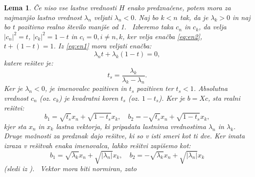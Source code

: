 \documentclass[12pt,a4paper]{amsart}\usepackage[slovene]{babel}%
\theoremstyle{definition}\newtheorem{definicija}{Definicija}[section]\newtheorem{primer}[definicija]{Primer}\newtheorem{opomba}[definicija]{Opomba}
\theoremstyle{plain}\newtheorem{lema}[definicija]{Lema}\newtheorem{izrek}[definicija]{Izrek}\newtheorem{trditev}[definicija]{Trditev}\newtheorem{posledica}[definicija]{Posledica}
\newcommand{\abs}[1]{ \left\lvert#1\right\rvert} \newcommand{\norm}[1]{\left\lVert#1\right\rVert}%
\begin{document}
{\begin{lema}
Če niso vse lastne vrednosti $H$ enako predznačene, potem mora za najmanjšo lastno vrednost $\lambda_n$ veljati $\lambda_n <0$. Naj bo $k<n$ tak, da je $\lambda_k >0$ in naj bo $t$ pozitivno realno število manjše od 1.  Izberemo taka $c_n$ in $c_k$, da velja  $\abs{c_n}^2 =t$, $\abs{c_k}^2=1-t$ in $c_i =0, i\not=n,k$, ker velja enačba \eqref{eq:en2}, $t+ (1-t)=1$. Iz \eqref{eq:en1} mora veljati enačba: $$\lambda_n t +\lambda_k (1-t)=0,$$ katere rešitev je:\begin{equation}t_s=\frac{\lambda_k}{\lambda_k -\lambda_n}.\end{equation}Ker je $\lambda_n <0$, je imenovalec pozitiven in $t_s$ pozitiven ter $t_s <1$. Absolutna vrednost $c_n$ (oz. $c_k$) je kvadratni koren $t_s$ (oz. $1-t_s$). Ker je $b=Xc$, sta realni rešitvi: $$b_1=\sqrt{t_s}x_n +\sqrt{1-t_s}x_k,\quad b_2=-\sqrt{t_s}x_n+\sqrt{1-t_s}x_k,$$ kjer sta $x_n$ in $x_k$ lastna vektorja, ki pripadata lastnima vrednostima $\lambda_n$ in $\lambda_k$. Druge možnosti za predznak dajo rešitve, ki so v isti smeri kot ti dve. Ker imata izraza v rešitvah enaka imenovalca, lahko rešitvi zapišemo kot: $$b_1=\sqrt{\lambda_k}x_n+\sqrt{\abs{\lambda_n}}x_k, \quad b_2=-\sqrt{\lambda_k}x_n+\sqrt{\abs{\lambda_n}}x_k$$(sledi iz \cite{lipkin}).  Vektor mora biti normiran, zato%

\end{lema}}
\end{document}
